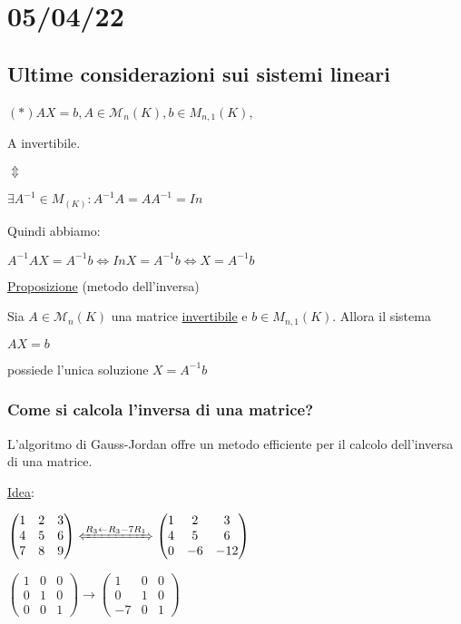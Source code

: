 \documentclass{article}
\newcommand{\ul}[1]{\underline{#1}}
\newcommand{\M}{\mathcal{M}}
\begin{document}
	\section{05/04/22}
	\subsection{Ultime considerazioni sui sistemi lineari}
$(*)AX=b,A\in \M_n(K),b\in M_{n,1}(K)$,

	A invertibile.

$\Updownarrow$

$\exists A^{-1}\in M_(K): A^{-1}A=AA^{-1}=In$

	Quindi abbiamo:

$A^{-1}AX=A^{-1}b\Leftrightarrow InX=A^{-1}b\Leftrightarrow X=A^{-1}b$

	\ul{Proposizione} (metodo dell'inversa)

	Sia $A\in \M_n(K)$ una matrice \ul{invertibile} e $b\in M_{n,1}(K)$. Allora il sistema

$AX=b$

	possiede l'unica soluzione $X=A^{-1}b$

	\subsubsection*{Come si calcola l'inversa di una matrice?}

	L'algoritmo di Gauss-Jordan offre un metodo efficiente per il calcolo dell'inversa di una matrice.

	\ul{Idea}:

$\begin{pmatrix}
	1 & 2 & 3 \\
	4 & 5 & 6 \\
	7 & 8 & 9 \\
\end{pmatrix}\xLeftrightarrow{R_3\leftarrow R_3-7R_1}
\begin{pmatrix}
	1 & 2  & 3   \\
	4 & 5  & 6   \\
	0 & -6 & -12 \\
\end{pmatrix}$

$\begin{pmatrix}
	1 & 0 & 0 \\
	0 & 1 & 0 \\
	0 & 0 & 1
\end{pmatrix}\rightarrow
\begin{pmatrix}
	1  & 0 & 0 \\
	0  & 1 & 0 \\
	-7 & 0 & 1
\end{pmatrix}$
\end{document}
